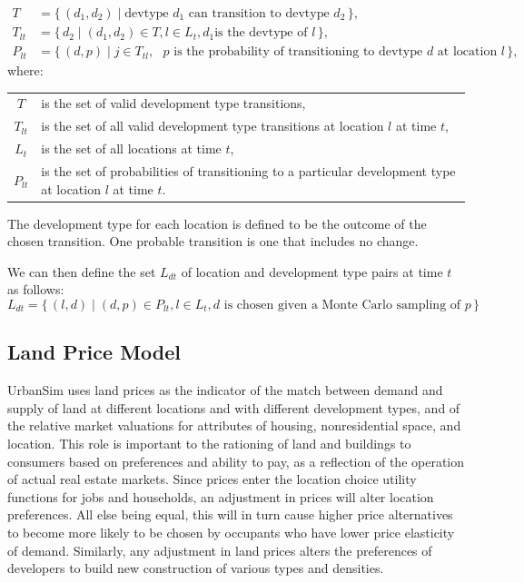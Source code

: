 \documentclass[fleqn]{article}
\begin{document}
\begin{align}
T &= \{\, (d_1, d_2) \mid \text{devtype $d_1$ can transition to devtype $d_2$} \,\},\\
T_{lt} &= \{\, d_2 \mid (d_1, d_2) \in T, l \in L_{t}, \text{$d_1$
is the
devtype of $l$} \,\},\\
P_{lt} &= \{\, (d, p) \mid j \in T_{tl}, \text{ $p$ is the
probability of transitioning to devtype $d$ at location $l$} \,\},
\end{align}
where:
\begin{center}
\begin{tabular}{c p{5.5in}}
$T$ & is the set of valid development type transitions,\\
$T_{lt}$ & is the set of all valid development type transitions at location $l$ at time $t$,\\
$L_{t}$ & is the set of all locations at time $t$,\\
$P_{lt}$ & is the set of probabilities of transitioning to a
particular development type at location $l$ at time $t$.\\
\end{tabular}
\end{center}

The development type for each location is defined to be the outcome of the
chosen transition.  One probable transition is one that includes
no change.

We can then define the set $L_{dt}$ of location and development type pairs
at time $t$ as follows:
\begin{equation}
L_{dt} = \{\, (l, d) \mid (d, p) \in P_{lt}, l \in L_{t}, \text{
$d$ is chosen given a Monte Carlo sampling of $p$} \,\}
\end{equation}

\subsection{Land Price Model}

UrbanSim uses land prices as the indicator of the match between
demand and supply of land at different locations and with
different development types, and of the relative market valuations
for attributes of housing, nonresidential space, and location.
This role is important to the rationing of land and buildings to
consumers based on preferences and ability to pay, as a reflection
of the operation of actual real estate markets. Since prices enter
the location choice utility functions for jobs and households, an
adjustment in prices will alter location preferences.  All else
being equal, this will in turn cause higher price alternatives to
become more likely to be chosen by occupants who have lower price
elasticity of demand.  Similarly, any adjustment in land prices
alters the preferences of developers to build new construction of various
types and densities.
\end{document}
